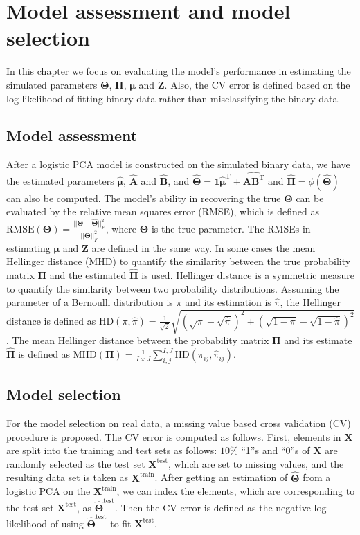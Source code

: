 \section{Model assessment and model selection}
In this chapter we focus on evaluating the model's performance in estimating the simulated parameters $\mathbf{\Theta}$, $\mathbf{\Pi}$, $\bm{\mu}$ and $\mathbf{Z}$. Also, the CV error is defined based on the log likelihood of fitting binary data rather than misclassifying the binary data.

\subsection{Model assessment}
After a logistic PCA model is constructed on the simulated binary data, we have the estimated parameters $\hat{\bm{\mu}}$, $\hat{\mathbf{A}}$ and $\hat{\mathbf{B}}$, and $\hat{\mathbf{\Theta}} = \mathbf{1}\hat{\bm{\mu}}^{\text{T}} + \hat{\mathbf{AB}^{\text{T}}}$ and $\hat{\mathbf{\Pi}} = \phi(\hat{\mathbf{\Theta}})$ can also be computed.
The model's ability in recovering the true $\mathbf{\Theta}$ can be evaluated by the relative mean squares error (RMSE), which is defined as $\text{RMSE}(\mathbf{\Theta}) = \frac{||\mathbf{\Theta}-\hat{\mathbf{\Theta}}||_F^2}{||\mathbf{\Theta}||_F^2}$, where $\mathbf{\Theta}$ is the true parameter. The RMSEs in estimating $\bm{\mu}$ and $\mathbf{Z}$ are defined in the same way. In some cases the mean Hellinger distance (MHD) to quantify the similarity between the true probability matrix $\mathbf{\Pi}$ and the estimated $\hat{\mathbf{\Pi}}$ is used. Hellinger distance \cite{le2012asymptotics} is a symmetric measure to quantify the similarity between two probability distributions. Assuming the parameter of a Bernoulli distribution is $\pi$ and its estimation is $\hat{\pi}$, the Hellinger distance is defined as $\text{HD}(\pi,\hat{\pi}) = \frac{1}{\sqrt{2}}\sqrt{(\sqrt{\pi}-\sqrt{\hat{\pi}})^2 + (\sqrt{1-\pi}-\sqrt{1-\hat{\pi}})^2}$. The mean Hellinger distance between the probability matrix $\mathbf{\Pi}$ and its estimate $\hat{\mathbf{\Pi}}$ is defined as $\text{MHD}(\mathbf{\Pi}) =  \frac{1}{I\times J} \sum_{i,j}^{I,J}\text{HD}(\pi_{ij},\hat{\pi}_{ij})$.

\subsection{Model selection}
For the model selection on real data, a missing value based cross validation (CV) procedure is proposed. The CV error is computed as follows. First, elements in $\mathbf{X}$ are split into the training and test sets as follows: $10\%$ ``1''s and ``0''s of $\mathbf{X}$ are randomly selected as the test set $\mathbf{X}^{\text{test}}$, which are set to missing values, and the resulting data set is taken as $\mathbf{X}^{\text{train}}$. After getting an estimation of $\hat{\mathbf{\Theta}}$ from a logistic PCA on the $\mathbf{X}^{\text{train}}$, we can index the elements, which are corresponding to the test set $\mathbf{X}^{\text{test}}$, as $\hat{\mathbf{\Theta}}^{\text{test}}$. Then the CV error is defined as the negative log-likelihood of using $\hat{\mathbf{\Theta}}^{\text{test}}$ to fit $\mathbf{X}^{\text{test}}$.

